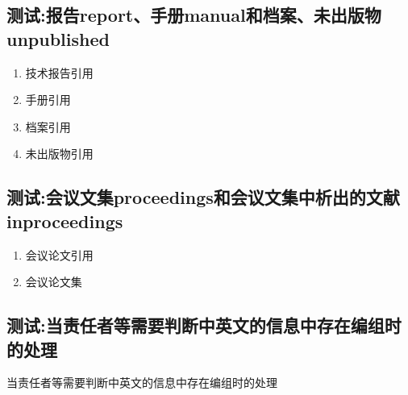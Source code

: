 \subsection{测试:报告report、手册manual和档案、未出版物unpublished}

\begin{refsection}
\begin{enumerate}
  \item 技术报告引用
  \cite{Calkin2011-8-9,Eggrers--,Humphrey1971--,DTFHA1990--,WHO1970--,汤万金2013-09-30--,中华人民共和国国务院新闻办公室2013-04-16--}
  \item 手册引用
  \cite{Lehman2013--,Lehman2015,Mittelbach2015--,Oetiker2011--,Robertson2011--,Sommerfeldt2011--,Umeki2010--, 胡振震2016,吴凌云2007--}
  \item 档案引用\cite{中国第一历史档案馆2001--}
  \item 未出版物引用\cite{包太雷2013--}
\end{enumerate}

\printbibliography[heading=bibliography,title=【报告、手册和档案、未出版物】]
\end{refsection}


\subsection{测试:会议文集proceedings和会议文集中析出的文献inproceedings}

\begin{refsection}
\begin{enumerate}
  \item 会议论文引用\cite{韩吉人1985-90-99,FOURNEY1971-17-38,FOURNEY1971-17-38a,Nemec1997-209-214,贾东琴2011-45-52,裴丽生1981-2-10,汪学军2002-22-25,张忠智1997-33-34}
      \cite{Choi2002-1075-1080,Dardari2002-201-206,Firoozbakhsh2003-473-477,Foerster2002-1931-1935,
      Fontana2002-309-313,Giorgetti2005-794-798,Giorgetti2006--,Li2004-21-24,Nasri2008-3616-3621,Piazzo2001--}
  \item 会议论文集\cite{陈志勇2011--,雷光春2012--,ROSENTHALL1963--,GANZHA2000--,Babu2014--,中国力学学会1999--,中国社会科学院台湾史研究中心2012--}
\end{enumerate}

\printbibliography[heading=bibliography,title=【会议文集和论文】]
\end{refsection}

\subsection{测试:当责任者等需要判断中英文的信息中存在编组时的处理}
\begin{refsection}
当责任者等需要判断中英文的信息中存在编组时的处理\cite{IFLAI1977b--,IFLAI1977--}
\cite{r27-BenHadjAlaya-FekiA.2008-1-5,中国企业投资协会2014--,中国企业投资协会2015--}

\printbibliography[heading=bibliography,title=【中英文判断信息中存在编组的测试】]
\end{refsection}

